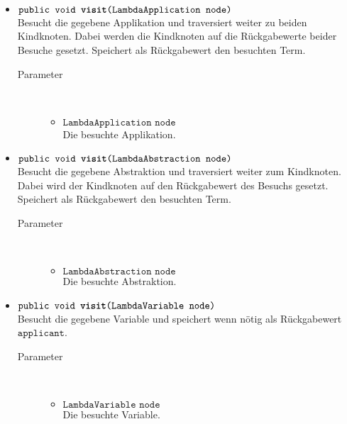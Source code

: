 \begin{description}
\begin{itemize}
		\item $\texttt{public void \textbf{visit}(LambdaApplication node)}$ \\ Besucht die gegebene Applikation und traversiert weiter zu beiden Kindknoten. Dabei werden die Kindknoten auf die Rückgabewerte beider Besuche gesetzt. Speichert als Rückgabewert den besuchten Term.
		\begin{description}
			\item[Parameter] \hfill \\
			\vspace{-.8cm}
			\begin{itemize}
				\item $\texttt{LambdaApplication node}$ \\ Die besuchte Applikation.
			\end{itemize}
		\end{description}
		
		\item $\texttt{public void \textbf{visit}(LambdaAbstraction node)}$ \\ Besucht die gegebene Abstraktion und traversiert weiter zum Kindknoten. Dabei wird der Kindknoten auf den Rückgabewert des Besuchs gesetzt. Speichert als Rückgabewert den besuchten Term.
		\begin{description}
			\item[Parameter] \hfill \\
			\vspace{-.8cm}
			\begin{itemize}
				\item $\texttt{LambdaAbstraction node}$ \\ Die besuchte Abstraktion.
			\end{itemize}
		\end{description}
		
		\item $\texttt{public void \textbf{visit}(LambdaVariable node)}$ \\ Besucht die gegebene Variable und speichert wenn nötig als Rückgabewert $\texttt{applicant}$.
		\begin{description}
			\item[Parameter] \hfill \\
			\vspace{-.8cm}
			\begin{itemize}
				\item $\texttt{LambdaVariable node}$ \\ Die besuchte Variable.
			\end{itemize}
		\end{description}
		

\end{itemize}
\end{description}
